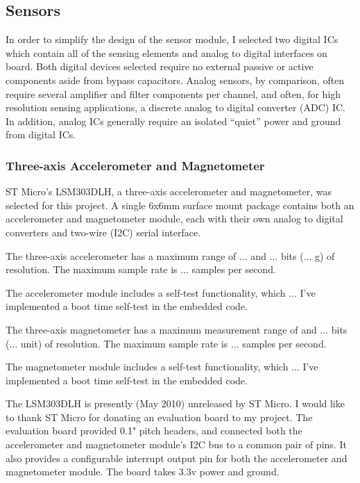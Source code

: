 \documentclass[12pt]{report}
\begin{document}
\subsection{Sensors}
In order to simplify the design of the sensor module, I selected two digital ICs which contain all of the sensing elements and analog to digital interfaces on board. 
Both digital devices selected require no external passive or active components aside from bypass capacitors. Analog sensors, by comparison, often require several amplifier and filter components per channel, and often, for high resolution sensing applications, a discrete analog to digital converter (ADC) IC. In addition, analog ICs generally require an isolated ``quiet'' power and ground from digital ICs. 

\subsubsection{Three-axis Accelerometer and Magnetometer}
ST Micro's LSM303DLH, a three-axis accelerometer and magnetometer, was selected for this project. A single 6x6mm surface mount package contains both an accelerometer and magnetometer module, each with their own analog to digital converters and two-wire (I2C) serial interface. 

The three-axis accelerometer has a maximum range of ... and ... bits (... g) of resolution. The maximum sample rate is ... samples per second.

The accelerometer module includes a self-test functionality, which ...
I've implemented a boot time self-test in the embedded code.

The three-axis magnetometer has a maximum measurement range of  and ... bits (... unit) of resolution. The maximum sample rate is ... samples per second. 

The magnetometer module includes a self-test functionality, which ...
I've implemented a boot time self-test in the embedded code.

The LSM303DLH is presently (May 2010) unreleased by ST Micro. I would like to thank ST Micro for donating an evaluation board to my project. The evaluation board provided 0.1" pitch headers, and connected both the accelerometer and magnetometer module's I2C bus to a common pair of pins. It also provides a configurable interrupt output pin for both the accelerometer and magnetometer module. The board takes 3.3v power and ground.

\end{document}
